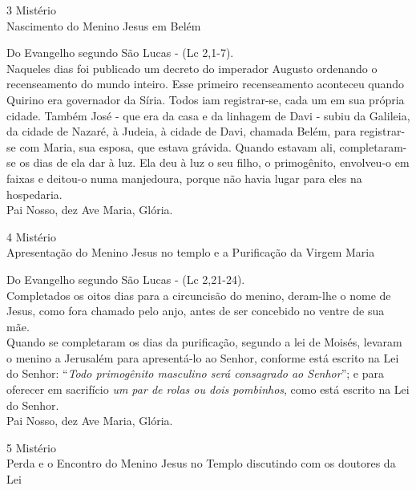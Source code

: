 \documentclass{book}
\begin{document}
\begin{center}
    3\textordmasculine{} Mistério \\ Nascimento do Menino Jesus em Belém
\end{center}
\begin{flushleft}
    Do Evangelho segundo São Lucas - (\textcolor{VioletRed2}{Lc 2,1-7}). \\
    \hfill{} \break{}
    Naqueles dias foi publicado um decreto do imperador Augusto ordenando o recenseamento do mundo inteiro. Esse primeiro recenseamento aconteceu quando Quirino era governador da Síria. Todos iam registrar-se, cada um em sua própria cidade. Também José - que era da casa e da linhagem de Davi - subiu da Galileia, da cidade de Nazaré, à Judeia, à cidade de Davi, chamada Belém, para registrar-se com Maria, sua esposa, que estava grávida. Quando estavam ali, completaram-se os dias de ela dar à luz. Ela deu à luz o seu filho, o primogênito, envolveu-o em faixas e deitou-o numa manjedoura, porque não havia lugar para eles na hospedaria. \\
    \hfill{} \break{}
    Pai Nosso, dez Ave Maria, Glória.
\end{flushleft}
\newpage
\begin{center}
    4\textordmasculine{} Mistério \\ Apresentação do Menino Jesus no templo e a Purificação da Virgem Maria
\end{center}
\begin{flushleft}
    Do Evangelho segundo São Lucas - (\textcolor{VioletRed2}{Lc 2,21-24}). \\
    \hfill{} \break{}
    Completados os oitos dias para a circuncisão do menino, deram-lhe o nome de Jesus, como fora chamado pelo anjo, antes de ser concebido no ventre de sua mãe. \\
    \hfill{} \break{}
    Quando se completaram os dias da purificação, segundo a lei de Moisés, levaram o menino a Jerusalém para apresentá-lo ao Senhor, conforme está escrito na Lei do Senhor: ``\textit{Todo primogênito masculino será consagrado ao Senhor}''; e para oferecer em sacrifício \textit{um par de rolas ou dois pombinhos}, como está escrito na Lei do Senhor. \\
    \hfill{} \break{}
    Pai Nosso, dez Ave Maria, Glória.
\end{flushleft}
\begin{center}
    5\textordmasculine{} Mistério \\ Perda e o Encontro do Menino Jesus no Templo discutindo com os doutores da Lei
\end{center}
\end{document}
